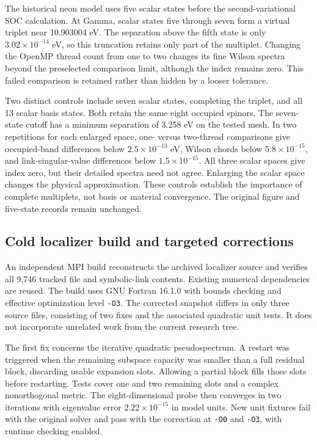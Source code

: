 \documentclass[11pt]{article}
\begin{document}
The historical neon model uses five scalar states before the
second-variational SOC calculation. At Gamma, scalar states five
through seven form a virtual triplet near 10.903004 eV. The separation
above the fifth state is only $3.02\times10^{-14}$ eV, so this
truncation retains only part of the multiplet. Changing the OpenMP
thread count from one to two changes its fine Wilson spectra beyond
the preselected comparison limit, although the index remains zero.
This failed comparison is retained rather than hidden by a looser
tolerance.

Two distinct controls include seven scalar states, completing the
triplet, and all 13 scalar basis states. Both retain the same eight
occupied spinors. The seven-state cutoff has a minimum separation of
3.258 eV on the tested mesh. In two repetitions for each enlarged
space, one- versus two-thread comparisons give occupied-band
differences below $2.5\times10^{-13}$ eV, Wilson chords below
$5.8\times10^{-15}$, and link-singular-value differences below
$1.5\times10^{-15}$. All three scalar spaces give index zero, but
their detailed spectra need not agree. Enlarging the scalar space
changes the physical approximation. These controls establish the
importance of complete multiplets, not basis or material convergence.
The original figure and five-state records remain unchanged.

\subsection{Cold localizer build and targeted corrections}
An independent MPI build reconstructs the archived localizer source
and verifies all 9,746 tracked file and symbolic-link contents.
Existing numerical dependencies are reused. The build uses GNU
Fortran 16.1.0 with bounds checking and effective optimization level
\texttt{-O3}. The corrected snapshot differs in only three source
files, consisting of two fixes and the associated quadratic unit tests.
It does not incorporate unrelated work from the current research tree.

The first fix concerns the iterative quadratic pseudospectrum.
A restart was triggered when the remaining subspace capacity was
smaller than a full residual block, discarding usable expansion slots.
Allowing a partial block fills those slots before restarting.
Tests cover one and two remaining slots and a complex nonorthogonal
metric. The eight-dimensional probe then converges in two iterations
with eigenvalue error $2.22\times10^{-15}$ in model units. New unit
fixtures fail with the original solver and pass with the correction
at \texttt{-O0} and \texttt{-O3}, with runtime checking enabled.
\end{document}

